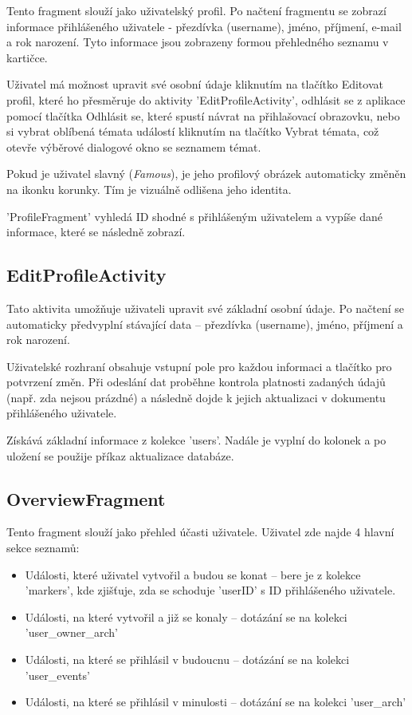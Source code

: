 Tento fragment slouží jako uživatelský profil. Po načtení fragmentu se zobrazí informace přihlášeného uživatele - přezdívka (username), jméno, příjmení, e-mail a rok narození. Tyto informace jsou zobrazeny formou přehledného seznamu v kartičce.

Uživatel má možnost upravit své osobní údaje kliknutím na tlačítko Editovat profil, které ho přesměruje do aktivity 'EditProfileActivity', odhlásit se z aplikace pomocí tlačítka Odhlásit se, které spustí návrat na přihlašovací obrazovku, nebo si vybrat oblíbená témata událostí kliknutím na tlačítko Vybrat témata, což otevře výběrové dialogové okno se seznamem témat.

Pokud je uživatel slavný (\textit{Famous}), je jeho profilový obrázek automaticky změněn na ikonku korunky. Tím je vizuálně odlišena jeho identita.

'ProfileFragment' vyhledá ID shodné s přihlášeným uživatelem a vypíše dané informace, které se následně zobrazí.



\subsection*{EditProfileActivity}

Tato aktivita umožňuje uživateli upravit své základní osobní údaje. Po načtení se automaticky předvyplní stávající data – přezdívka (username), jméno, příjmení a rok narození. 

Uživatelské rozhraní obsahuje vstupní pole pro každou informaci a tlačítko pro potvrzení změn. Při odeslání dat proběhne kontrola platnosti zadaných údajů (např. zda nejsou prázdné) a následně dojde k jejich aktualizaci v dokumentu přihlášeného uživatele.

Získává základní informace z kolekce 'users'. Nadále je vyplní do kolonek a po uložení se použije příkaz aktualizace databáze.



\subsection*{OverviewFragment}

Tento fragment slouží jako přehled účasti uživatele. Uživatel zde najde 4 hlavní sekce seznamů:
\begin{itemize}
    \item Události, které uživatel vytvořil a budou se konat – bere je z kolekce 'markers', kde zjišťuje, zda se schoduje 'userID' s ID přihlášeného uživatele.
    \item Události, na které vytvořil a již se konaly – dotázání se na kolekci 'user\_owner\_arch'
    \item Události, na které se přihlásil v budoucnu – dotázání se na kolekci 'user\_events'
    \item Události, na které se přihlásil v minulosti – dotázání se na kolekci 'user\_arch'

\end{itemize}

